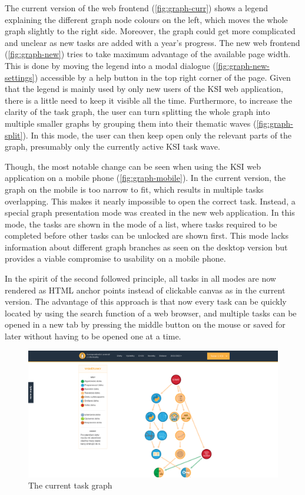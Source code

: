 \documentclass[
  digital, %
  oneside, %
  lof,     %
  nolot,     %
]{fithesis4}
\begin{document}
{The current version of the web frontend (\autoref{fig:graph-curr}) shows a legend explaining the different graph node colours on the left, which moves the whole graph slightly to the right side. Moreover, the graph could get more complicated and unclear as new tasks are added with a year's progress. The new web frontend (\autoref{fig:graph-new}) tries to take maximum advantage of the available page width. This is done by moving the legend into a modal dialogue (\autoref{fig:graph-new-settings}) accessible by a help button in the top right corner of the page. Given that the legend is mainly used by only new users of the \acrshort{KSI} web application, there is a little need to keep it visible all the time. Furthermore, to increase the clarity of the task graph, the user can turn splitting the whole graph into multiple smaller graphs by grouping them into their thematic waves (\autoref{fig:graph-split}). In this mode, the user can then keep open only the relevant parts of the graph, presumably only the currently active \acrshort{KSI} task wave.

Though, the most notable change can be seen when using the \acrshort{KSI} web application on a mobile phone (\autoref{fig:graph-mobile}). In the current version, the graph on the mobile is too narrow to fit, which results in multiple tasks overlapping. This makes it nearly impossible to open the correct task. Instead, a special graph presentation mode was created in the new web application. In this mode, the tasks are shown in the mode of a list, where tasks required to be completed before other tasks can be unlocked are shown first. This mode lacks information about different graph branches as seen on the desktop version but provides a viable compromise to usability on a mobile phone.

In the spirit of the second followed principle, all tasks in all modes are now rendered as \acrshort{HTML} anchor points instead of clickable canvas as in the current version. The advantage of this approach is that now every task can be quickly located by using the search function of a web browser, and multiple tasks can be opened in a new tab by pressing the middle button on the mouse or saved for later without having to be opened one at a time.

\begin{figure}
\includegraphics[width=\textwidth]{assets/img/graph_curr}
\caption{The current task graph}
\label{fig:graph-curr}
\end{figure}

}
\end{document}
